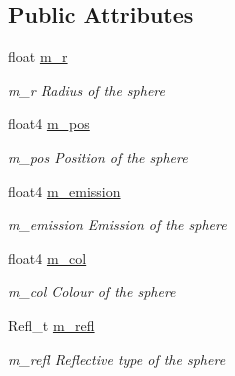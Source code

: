 \subsection*{Public Attributes}
\begin{DoxyCompactItemize}
\item 
\hypertarget{structSphere_a2476da8402053c022436054f108bf8aa}{float \hyperlink{structSphere_a2476da8402053c022436054f108bf8aa}{m\-\_\-r}}\label{structSphere_a2476da8402053c022436054f108bf8aa}

\begin{DoxyCompactList}\small\item\em m\-\_\-r Radius of the sphere \end{DoxyCompactList}\item 
\hypertarget{structSphere_a2ab691669ddac359fa0b5ea7b219af26}{float4 \hyperlink{structSphere_a2ab691669ddac359fa0b5ea7b219af26}{m\-\_\-pos}}\label{structSphere_a2ab691669ddac359fa0b5ea7b219af26}

\begin{DoxyCompactList}\small\item\em m\-\_\-pos Position of the sphere \end{DoxyCompactList}\item 
\hypertarget{structSphere_ad64c90d5b23a0af4f9e3bc7d9fce9da4}{float4 \hyperlink{structSphere_ad64c90d5b23a0af4f9e3bc7d9fce9da4}{m\-\_\-emission}}\label{structSphere_ad64c90d5b23a0af4f9e3bc7d9fce9da4}

\begin{DoxyCompactList}\small\item\em m\-\_\-emission Emission of the sphere \end{DoxyCompactList}\item 
\hypertarget{structSphere_aa763efd3f99c9660f450b1925affc014}{float4 \hyperlink{structSphere_aa763efd3f99c9660f450b1925affc014}{m\-\_\-col}}\label{structSphere_aa763efd3f99c9660f450b1925affc014}

\begin{DoxyCompactList}\small\item\em m\-\_\-col Colour of the sphere \end{DoxyCompactList}\item 
\hypertarget{structSphere_a4b7464c09b9fe172751c5689e8f85561}{Refl\-\_\-t \hyperlink{structSphere_a4b7464c09b9fe172751c5689e8f85561}{m\-\_\-refl}}\label{structSphere_a4b7464c09b9fe172751c5689e8f85561}

\begin{DoxyCompactList}\small\item\em m\-\_\-refl Reflective type of the sphere \end{DoxyCompactList}\end{DoxyCompactItemize}



